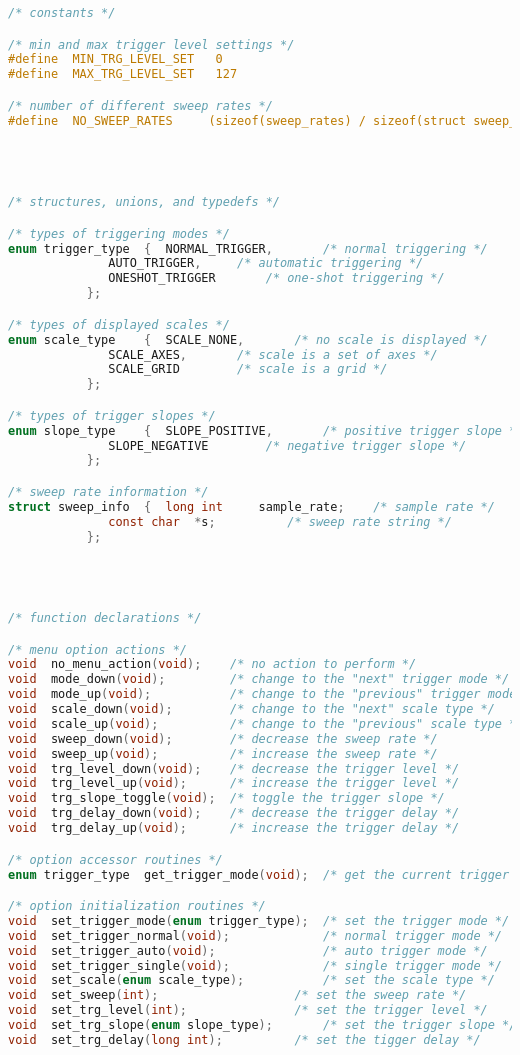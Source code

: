 \begin{lstlisting}[language=C]
/* constants */

/* min and max trigger level settings */
#define  MIN_TRG_LEVEL_SET   0
#define  MAX_TRG_LEVEL_SET   127

/* number of different sweep rates */
#define  NO_SWEEP_RATES     (sizeof(sweep_rates) / sizeof(struct sweep_info))




/* structures, unions, and typedefs */

/* types of triggering modes */
enum trigger_type  {  NORMAL_TRIGGER,		/* normal triggering */
		      AUTO_TRIGGER,		/* automatic triggering */
		      ONESHOT_TRIGGER		/* one-shot triggering */
		   };

/* types of displayed scales */
enum scale_type    {  SCALE_NONE,		/* no scale is displayed */
		      SCALE_AXES,		/* scale is a set of axes */
		      SCALE_GRID		/* scale is a grid */
		   };

/* types of trigger slopes */
enum slope_type    {  SLOPE_POSITIVE,		/* positive trigger slope */
		      SLOPE_NEGATIVE		/* negative trigger slope */
		   };

/* sweep rate information */
struct sweep_info  {  long int     sample_rate;    /* sample rate */
		      const char  *s;		   /* sweep rate string */
		   };




/* function declarations */

/* menu option actions */
void  no_menu_action(void);    /* no action to perform */
void  mode_down(void);         /* change to the "next" trigger mode */
void  mode_up(void);           /* change to the "previous" trigger mode */
void  scale_down(void);        /* change to the "next" scale type */
void  scale_up(void);          /* change to the "previous" scale type */
void  sweep_down(void);        /* decrease the sweep rate */
void  sweep_up(void);          /* increase the sweep rate */
void  trg_level_down(void);    /* decrease the trigger level */
void  trg_level_up(void);      /* increase the trigger level */
void  trg_slope_toggle(void);  /* toggle the trigger slope */
void  trg_delay_down(void);    /* decrease the trigger delay */
void  trg_delay_up(void);      /* increase the trigger delay */

/* option accessor routines */
enum trigger_type  get_trigger_mode(void);  /* get the current trigger mode */

/* option initialization routines */
void  set_trigger_mode(enum trigger_type);  /* set the trigger mode */
void  set_trigger_normal(void);  			/* normal trigger mode */
void  set_trigger_auto(void);  				/* auto trigger mode */
void  set_trigger_single(void);  			/* single trigger mode */
void  set_scale(enum scale_type);           /* set the scale type */
void  set_sweep(int);         		    /* set the sweep rate */
void  set_trg_level(int);     		    /* set the trigger level */
void  set_trg_slope(enum slope_type);       /* set the trigger slope */
void  set_trg_delay(long int);     	    /* set the tigger delay */


\end{lstlisting}
